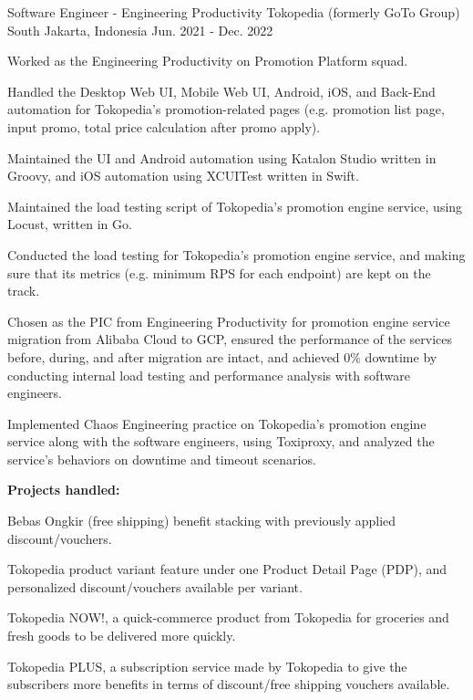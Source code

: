 \begin{cventries}
  \cventry
    {Software Engineer - Engineering Productivity} %
    {Tokopedia (formerly GoTo Group)} %
    {South Jakarta, Indonesia} %
    {Jun. 2021 - Dec. 2022} %
    {
      \begin{cvitems}
        \item {Worked as the Engineering Productivity on Promotion Platform squad.}
        \item {Handled the Desktop Web UI, Mobile Web UI, Android, iOS, and Back-End automation for Tokopedia's promotion-related pages (e.g. promotion list page, input promo, total price calculation after promo apply).}
        \item {Maintained the UI and Android automation using Katalon Studio written in Groovy, and iOS automation using XCUITest written in Swift.}
        \item {Maintained the load testing script of Tokopedia's promotion engine service, using Locust, written in Go.}
        \item {Conducted the load testing for Tokopedia's promotion engine service, and making sure that its metrics (e.g. minimum RPS for each endpoint) are kept on the track.}
        \item {Chosen as the PIC from Engineering Productivity for promotion engine service migration from Alibaba Cloud to GCP, ensured the performance of the services before, during, and after migration are intact, and achieved 0\% downtime by conducting internal load testing and performance analysis with software engineers.}
        \item {Implemented Chaos Engineering practice on Tokopedia's promotion engine service along with the software engineers, using Toxiproxy, and analyzed the service's behaviors on downtime and timeout scenarios.}
        \item {\textbf{Projects handled:}
          \begin{cvsubitems}
            \item {Bebas Ongkir (free shipping) benefit stacking with previously applied discount/vouchers.}
            \item {Tokopedia product variant feature under one Product Detail Page (PDP), and personalized discount/vouchers available per variant.}
            \item {Tokopedia NOW!, a quick-commerce product from Tokopedia for groceries and fresh goods to be delivered more quickly.}
            \item {Tokopedia PLUS, a subscription service made by Tokopedia to give the subscribers more benefits in terms of discount/free shipping vouchers available.}
          \end{cvsubitems}
        }
      \end{cvitems}      
    }


\end{cventries}
